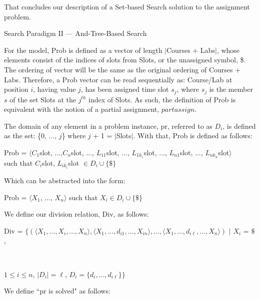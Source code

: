 \documentclass[11pt, oneside]{article}   	%
\begin{document}
\noindent That concludes our description of a Set-based Search solution to the assignment problem.

\newpage

\centerline{{\Large Search Paradigm II --- And-Tree-Based Search}}


\noindent For the model, Prob is defined as a vector of length $\vert$Courses + Labs$\vert$, whose elements consist of the indices of slots from Slots, or the unassigned symbol, \$. The ordering of vector will be the same as the original ordering of Courses + Labs. Therefore, a Prob vector can be read sequentially as: Course/Lab at position $i$, having value $j$, has been assigned time slot $s_{j}$, where $s_{j}$ is the member $s$ of the set Slots at the $j^{th}$ index of Slots. As such, the definition of Prob is equivalent with the notion of a partial assignment, $\textit{partassign}$.

\noindent The domain of any element in a problem instance, pr, referred to as $D_{i}$, is defined as the set: \{0, $\dots$, $j$\} where $j$ + 1 = $\vert$Slots$\vert$. With that, Prob is defined as follows:

\begin{center}
{Prob = $\langle$$C_{1}$slot, $\dots$,$C_{n}$slot, $\dots$, $L_{11}$slot, $\dots$, $L_{1k_{1}}$slot, $\dots$, $L_{n1}$slot,  $\dots$, $L_{nk_{n}}$slot$\rangle$ \\ such that $C_{i}$slot, $L_{ik_{i}}$slot $\in D_{i} \cup \big\{\$\big\}$}
\end{center}

\noindent Which can be abstracted into the form:

\begin{center}
{Prob = $\langle$$X_{1}$, $\dots$, $X_{n}$$\rangle$ such that $X_{i} \in D_{i} \cup \big\{\$\big\}$ }
\end{center}
We define our division relation, Div, as follows:\\

\noindent \centerline{Div = $\{(\langle X_1, \dots, X_i, \dots, X_n \rangle, \langle X_1, \dots, d_{i1}, \dots, X_{in} \rangle, \dots, \langle X_1, \dots, d_{i\ell}, \dots, X_n \rangle)$ $\vert$ $X_i$ = $\$$,}\\
\centerline{$1 \le i \le n$, $\vert D_i \vert = \ell$, $D_i = \{d_i, \dots, d_{i\ell}\}\}$}

\noindent We define ``pr is solved" as follows:
\end{document}
